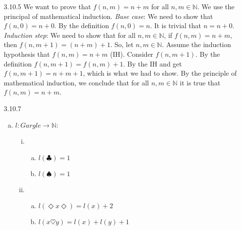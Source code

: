 \begin{itemize}
      \item[3.10.5] We want to prove that $f(n,m) = n + m$ for all $n, m \in \mathbb{N}$.
        We use the principal of mathematical induction.
        \emph{Base case}:
        We need to show that $f(n,0) = n + 0$.
        By the definition $f(n,0) = n$.
        It is trivial that $n = n + 0$.
        \emph{Induction step}:
        We need to show that for all $n, m \in \mathbb{N}$,
        if $f(n,m)=n+m$, then $f(n,m+1)=(n+m)+1$.
        So, let $n, m \in \mathbb{N}$.
        Assume the induction hypothesis that $f(n,m) = n + m$ (IH).
        Consider $f(n, m + 1)$.
        By the definition $f(n,m+1) = f(n,m) + 1$.
        By the IH and get $f(n,m+1) = n + m + 1$, which is what we had to show.
        By the principle of mathematical induction,
        we conclude that for all $n, m \in \mathbb{N}$ it is true that $f(n,m) = n + m$.

\item[3.10.7]
\begin{enumerate}[(a)]
    \item 
    $l: Gargle \rightarrow \mathbb{N}$:\begin{enumerate}[(i)]
        \item \begin{enumerate}[(a)]
            \item $l(\clubsuit) = 1$
        \item $l(\spadesuit) = 1$
        \end{enumerate}
        \item \begin{enumerate}[(a)]
            \item $l(\Diamond x\Diamond)= l(x) + 2$
            \item $l(x\heartsuit y)= l(x)+l(y)+1 $
        \end{enumerate}
    \end{enumerate}



\end{enumerate}
\end{itemize}
